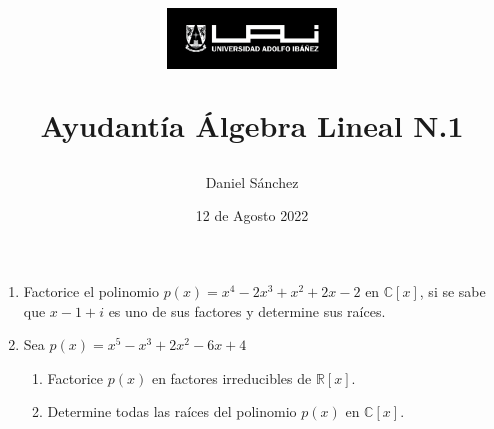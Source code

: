\documentclass[12pt]{article}
\begin{document}
\title{
    \begin{figure}[ht]
        \centering
        \includegraphics[width = 0.4\textwidth, ]{../../logo-uai.jpg}\\
    \end{figure}
    Ayudant\'ia \'Algebra Lineal N.1}
\date{12 de Agosto 2022}
\author{Daniel S\'anchez}
\maketitle

\begin{enumerate}
    \item Factorice el polinomio $p(x) = x^4-2x^3+x^2+2x-2$ en $\mathbb{C}\left[x\right]$, si se sabe que
          $x-1+i$ es uno de sus factores y determine sus ra\'ices.
    \item Sea $p(x) = x^5-x^3+2x^2-6x+4$
          \begin{enumerate}
              \item Factorice $p(x)$ en factores irreducibles de $\mathbb{R}\left[x\right]$.
              \item Determine todas las ra\'ices del polinomio $p(x)$ en $\mathbb{C}\left[x\right]$.
          \end{enumerate}
          

\end{enumerate}
\end{document}
